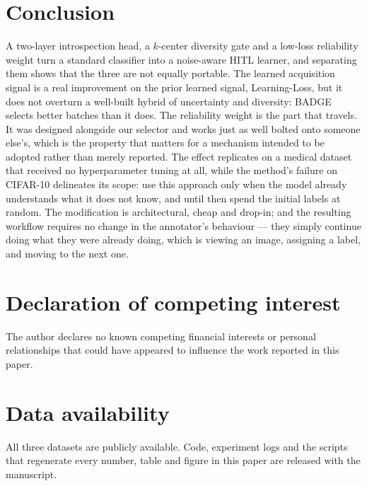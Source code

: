 \documentclass[a4paper,fleqn,longmktitle]{cas-sc}
\begin{document}
\section{Conclusion}\label{sec:conclusion}
A two-layer introspection head, a $k$-center diversity gate and a
low-loss reliability weight turn a standard classifier into a
noise-aware HITL learner, and separating them shows that the three are
not equally portable. The learned acquisition signal is a real
improvement on the prior learned signal, Learning-Loss, but it does not
overturn a well-built hybrid of uncertainty and diversity: BADGE
selects better batches than it does. The reliability weight is the part
that travels. It was designed alongside our selector and works just as
well bolted onto someone else's, which is the property that matters for
a mechanism intended to be adopted rather than merely reported. The effect
replicates on a medical dataset that received no hyperparameter tuning
at all, while the method's failure on CIFAR-10 delineates its scope:
use this approach only when the model already understands what it does
not know, and until then spend the initial labels at random. The
modification is architectural, cheap and drop-in; and the resulting
workflow requires no change in the annotator's behaviour --- they
simply continue doing what they were already doing, which is viewing an
image, assigning a label, and moving to the next one.

\clearpage
\section*{Declaration of competing interest}
The author declares no known competing financial interests or personal
relationships that could have appeared to influence the work reported
in this paper.

\section*{Data availability}
All three datasets are publicly available. Code, experiment logs and
the scripts that regenerate every number, table and figure in this
paper are released with the manuscript.

\printcredits



\end{document}

